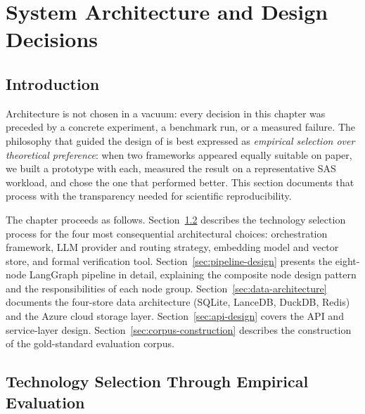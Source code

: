 
\chapter{System Architecture and Design Decisions}
\label{ch:architecture}

\section{Introduction}
\label{sec:ch4-intro}

Architecture is not chosen in a vacuum: every decision in this chapter was
preceded by a concrete experiment, a benchmark run, or a measured failure. The
philosophy that guided the design of \codara{} is best expressed as
\emph{empirical selection over theoretical preference}: when two frameworks
appeared equally suitable on paper, we built a prototype with each, measured
the result on a representative SAS workload, and chose the one that performed
better. This section documents that process with the transparency needed for
scientific reproducibility.

The chapter proceeds as follows. Section~\ref{sec:tech-selection} describes
the technology selection process for the four most consequential architectural
choices: orchestration framework, LLM provider and routing strategy, embedding
model and vector store, and formal verification tool. Section~\ref{sec:pipeline-design}
presents the eight-node LangGraph pipeline in detail, explaining the composite
node design pattern and the responsibilities of each node group.
Section~\ref{sec:data-architecture} documents the four-store data architecture
(SQLite, LanceDB, DuckDB, Redis) and the Azure cloud storage layer.
Section~\ref{sec:api-design} covers the API and service-layer design.
Section~\ref{sec:corpus-construction} describes the construction of the
gold-standard evaluation corpus.

\section{Technology Selection Through Empirical Evaluation}
\label{sec:tech-selection}

